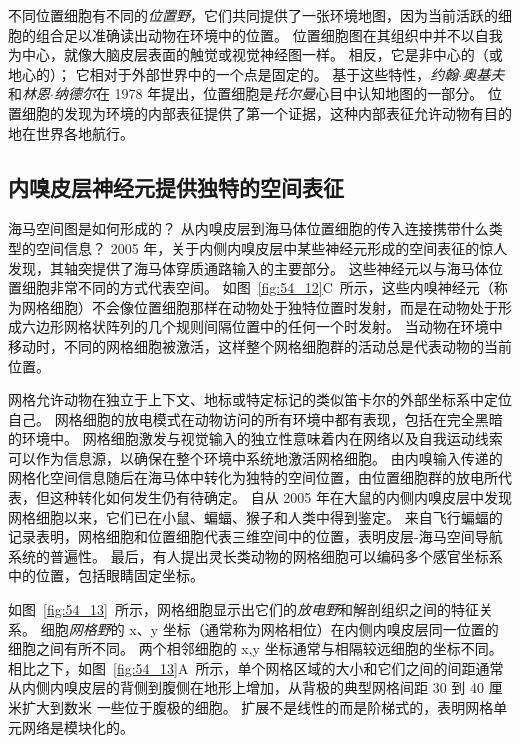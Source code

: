 不同位置细胞有不同的\textit{位置野}，它们共同提供了一张环境地图，因为当前活跃的细胞的组合足以准确读出动物在环境中的位置。
位置细胞图在其组织中并不以自我为中心，就像大脑皮层表面的触觉或视觉神经图一样。
相反，它是非中心的（或地心的）； 它相对于外部世界中的一个点是固定的。
基于这些特性，\textit{约翰$\cdot$奥基夫}和\textit{林恩$\cdot$纳德尔}在 1978 年提出，位置细胞是\textit{托尔曼}心目中认知地图的一部分。
位置细胞的发现为环境的内部表征提供了第一个证据，这种内部表征允许动物有目的地在世界各地航行。



\subsection{内嗅皮层神经元提供独特的空间表征}

海马空间图是如何形成的？
从内嗅皮层到海马体位置细胞的传入连接携带什么类型的空间信息？
2005 年，关于内侧内嗅皮层中某些神经元形成的空间表征的惊人发现，其轴突提供了海马体穿质通路输入的主要部分。
这些神经元以与海马体位置细胞非常不同的方式代表空间。
如图~\ref{fig:54_12}C~所示，这些内嗅神经元（称为网格细胞）不会像位置细胞那样在动物处于独特位置时发射，而是在动物处于形成六边形网格状阵列的几个规则间隔位置中的任何一个时发射。
当动物在环境中移动时，不同的网格细胞被激活，这样整个网格细胞群的活动总是代表动物的当前位置。


网格允许动物在独立于上下文、地标或特定标记的类似笛卡尔的外部坐标系中定位自己。
网格细胞的放电模式在动物访问的所有环境中都有表现，包括在完全黑暗的环境中。
网格细胞激发与视觉输入的独立性意味着内在网络以及自我运动线索可以作为信息源，以确保在整个环境中系统地激活网格细胞。
由内嗅输入传递的网格化空间信息随后在海马体中转化为独特的空间位置，由位置细胞群的放电所代表，但这种转化如何发生仍有待确定。
自从 2005 年在大鼠的内侧内嗅皮层中发现网格细胞以来，它们已在小鼠、蝙蝠、猴子和人类中得到鉴定。
来自飞行蝙蝠的记录表明，网格细胞和位置细胞代表三维空间中的位置，表明皮层-海马空间导航系统的普遍性。
最后，有人提出灵长类动物的网格细胞可以编码多个感官坐标系中的位置，包括眼睛固定坐标。


如图~\ref{fig:54_13}~所示，网格细胞显示出它们的\textit{放电野}和解剖组织之间的特征关系。
细胞\textit{网格野}的 x、y 坐标（通常称为网格相位）在内侧内嗅皮层同一位置的细胞之间有所不同。
两个相邻细胞的 x,y 坐标通常与相隔较远细胞的坐标不同。
相比之下，如图~\ref{fig:54_13}A~所示，单个网格区域的大小和它们之间的间距通常从内侧内嗅皮层的背侧到腹侧在地形上增加，从背极的典型网格间距 30 到 40 厘米扩大到数米 一些位于腹极的细胞。
扩展不是线性的而是阶梯式的，表明网格单元网络是模块化的。


